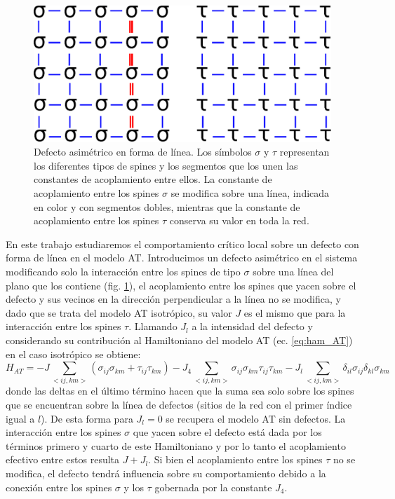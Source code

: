 \begin{figure}[h!]
\begin{center}
\includegraphics[scale=0.65]{graf/line_defect_sigma_tau_5x5.eps}
\end{center}
\caption{Defecto asim\'etrico en forma de línea. Los símbolos $\sigma$ y $\tau$ representan los diferentes tipos de spines y los segmentos que los unen
las constantes de acoplamiento entre ellos. La constante de acoplamiento entre los spines $\sigma$ se modifica sobre una l\'inea, indicada en color y con
 segmentos dobles, mientras que la constante de acoplamiento entre los spines $\tau$ conserva su valor en toda la red.}
\label{fig:line_defect_sigma}
\end{figure}

En este trabajo estudiaremos el comportamiento crítico local sobre un defecto con forma de línea en el modelo AT.
Introducimos un defecto asimétrico \cite{AT_naon} en el sistema modificando solo la interacción entre los spines de tipo $\sigma$ sobre una línea
del plano que los contiene (fig. \ref{fig:line_defect_sigma}), el acoplamiento entre los spines que yacen sobre el defecto y sus
 vecinos en la dirección perpendicular a la línea no se modifica, y dado que se trata del modelo AT 
 isotrópico, su valor $J$ es el mismo que para la interacción entre los spines $\tau$.
Llamando $J_{l}$ a la intensidad del defecto y considerando su contribución
 al Hamiltoniano del modelo AT (ec. \ref{eq:ham_AT}) en el caso isotrópico se obtiene:
\\
\begin{equation}
	\label{eq:line_pot}
	H_{AT}=-J\sum_{<ij,km>}(\sigma_{ij}\sigma_{km}+\tau_{ij}\tau_{km})-J_{4}\sum_{<ij,km>}\sigma_{ij}\sigma_{km}\tau_{ij}\tau_{km}-J_{l}\sum_{<ij,km>}\delta_{il}\sigma_{ij}\delta_{kl}\sigma_{km}
\end{equation}
donde las deltas en el último término hacen que la suma sea solo sobre los spines que se encuentran sobre la línea de defectos (sitios de la red con el primer índice igual a $l$).
De esta forma para $J_{l}=0$ se recupera el modelo AT sin defectos. La interacción entre los spines $\sigma$ que yacen sobre el defecto está dada por los términos primero y cuarto
 de este Hamiltoniano y por lo tanto el acoplamiento efectivo entre estos resulta $J+J_{l}$. Si bien el acoplamiento entre los spines $\tau$ no se modifica, el defecto tendrá influencia
 sobre su comportamiento debido a la conexión entre los spines $\sigma$ y los $\tau$ gobernada por la constante $J_{4}$.\\

